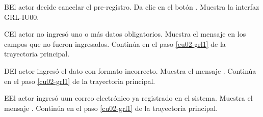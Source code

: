 \begin{UCtrayectoriaA}{B}{El actor decide cancelar el pre-registro.}
	\UCpaso [\UCactor] Da clic en el botón .
	\UCpaso [\UCsist] Muestra la interfaz GRL-IU00.
\end{UCtrayectoriaA} 

\begin{UCtrayectoriaA}{C}{El actor no ingresó uno o más datos obligatorios.}
	\UCpaso [\UCsist] Muestra el mensaje  en los campos que no
	fueron ingresados.
	\UCpaso [\UCsist] Continúa en el paso \ref{cu02-grl1} de la trayectoria principal.
\end{UCtrayectoriaA} 

\begin{UCtrayectoriaA}{D}{El actor ingresó el dato con formato incorrecto.}
	\UCpaso [\UCsist] Muestra el mensaje .
	\UCpaso [\UCsist] Continúa en el paso \ref{cu02-grl1} de la trayectoria principal.
\end{UCtrayectoriaA} 

\begin{UCtrayectoriaA}{E}{El actor ingresó uun correo electrónico ya registrado en el sistema.}
	\UCpaso [\UCsist] Muestra el mensaje .
	\UCpaso [\UCsist] Continúa en el paso \ref{cu02-grl1} de la trayectoria principal.
\end{UCtrayectoriaA} 